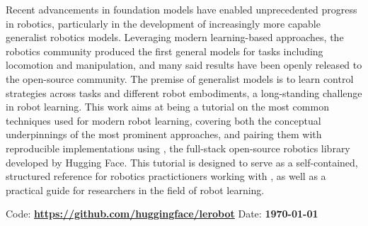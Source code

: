 Recent advancements in foundation models have enabled unprecedented progress in robotics, particularly in the development of increasingly more capable generalist robotics models.
Leveraging modern learning-based approaches, the robotics community produced the first general models for tasks including locomotion and manipulation, and many said results have been openly released to the open-source community.
The premise of generalist models is to learn control strategies across tasks and different robot embodiments, a long-standing challenge in robot learning.
This work aims at being a tutorial on the most common techniques used for modern robot learning, covering both the conceptual underpinnings of the most prominent approaches, and pairing them with reproducible implementations using \lerobot, the full-stack open-source robotics library developed by Hugging Face.
This tutorial is designed to serve as a self-contained, structured reference for robotics practictioners working with \lerobot, as well as a practical guide for researchers in the field of robot learning.
\newline

Code: \textbf{\url{https://github.com/huggingface/lerobot}}
\newline
Date: \textbf{\today}